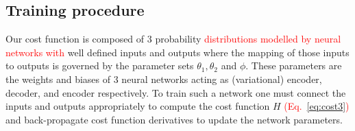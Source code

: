 \documentclass[%
showpacs,
nofootinbib,
 amsmath,amssymb,
 aps,
 twocolumn,
 prl,
 reprint,
floatfix,
]{revtex4-1}
\newcommand{\new}[1]{\textcolor{red}{#1}}
\begin{document}
\subsection{Training procedure}
%
%
Our cost function is composed of 3 probability \new{distributions modelled by
neural networks with} well defined inputs and outputs where the mapping of
those inputs to outputs is governed by the parameter sets
$\theta_{1},\theta_{2}$ and $\phi$. These parameters are the weights and biases
of 3 neural networks acting as (variational) encoder, decoder, and encoder
respectively. To train such a network one must connect the inputs and outputs
appropriately to compute the cost function $H$ \new{(Eq.~\ref{eq:cost3})} and
back-propagate cost function derivatives to update the network parameters. 
\end{document}
